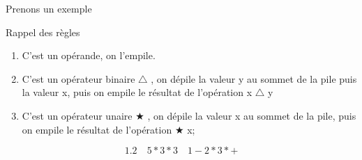 \documentclass[10pt,xcolor=dvipsnames]{beamer}
\begin{document}
\begin{frame}{Prenons un exemple}
\begin{exampleblock}{Rappel des règles}
        \begin{enumerate}
    \item C'est un opérande, on l'empile.
    \item C'est un opérateur binaire $\triangle$ , on dépile la valeur y au sommet de la pile puis la valeur x, puis on empile le résultat de l'opération x $\triangle$ y
    \item C'est un opérateur unaire $\bigstar$ , on dépile la valeur x au sommet de la pile, puis on empile le résultat de l'opération $\bigstar$ x;
\end{enumerate}
\end{exampleblock}
\begin{equation*}
    1.2 \quad 5 * 3 * 3 \quad 1 - 2 * 3 * +
\end{equation*}
\end{frame}
\end{document}

